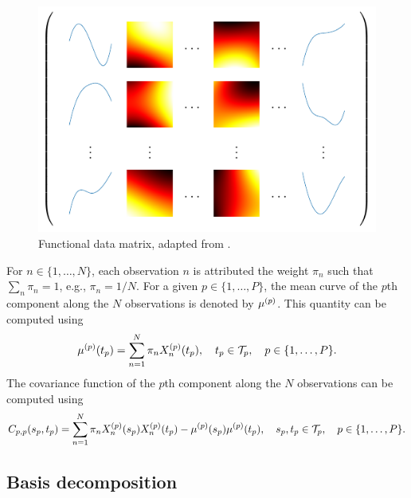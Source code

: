 \begin{figure}
    \centering
    \includegraphics[]{figures/data_matrix.pdf}
    \caption{Functional data matrix, adapted from \cite{berrenderoPrincipalComponentsMultivariate2011}.}
    \label{fig:data_matrix}
\end{figure}

For $n \in \{1, \dots, N\}$, each observation $n$ is attributed the weight $\pi_n$ such that $\sum_n \pi_n = 1$, e.g., $\pi_n = 1/N$.
For a given $p \in \{1, \dots, P\}$, the mean curve of the $p$th component along the $N$ observations is denoted by $\mu^{(p)}$. This quantity can be computed using 
\begin{equation*}\label{eq:mu_estimation}
    \mu^{(p)}(t_p) = \sum_{n = 1}^N \pi_nX_n^{(p)}(t_p), \quad t_p \in \mathcal{T}_{p}, \quad p \in \{1, \dots, P\}.
\end{equation*}
The covariance function of the $p$th component along the $N$ observations can be computed using
\begin{equation}\label{eq:cov_estimation}
    C_{p, p}(s_p, t_p) = \sum_{n = 1}^N \pi_nX_n^{(p)}(s_p)X_n^{(p)}(t_p) - \mu^{(p)}(s_p)\mu^{(p)}(t_p), \quad s_p, t_p \in \mathcal{T}_{p}, \quad p \in \{1, \dots, P\}.
\end{equation}

\subsection{Basis decomposition} %
\label{sub:basis_decomposition}


